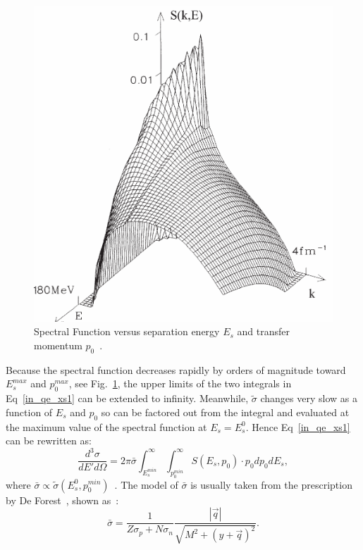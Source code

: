 \begin{figure}[!ht]
  \begin{center}
    \includegraphics[type=pdf,ext=.pdf,read=.pdf,width=0.60\linewidth]{./figures/physics/pkem}
    \caption[Spectral Function]{\footnotesize{Spectral Function versus separation energy $E_{s}$ and transfer momentum $p_{0}$~\cite{qe_donal}.}}
    \label{pkem}
  \end{center}
\end{figure}
Because the spectral function decreases rapidly by orders of magnitude toward $E_{s}^{max}$ and $p_{0}^{max}$, see Fig.~\ref{pkem}, the upper limits of the two integrals in Eq~\eqref{in_qe_xs1} can be extended to infinity. Meanwhile, $\tilde{\sigma}$ changes very slow as a function of $E_{s}$ and $p_{0}$ so can be factored out from the integral and evaluated at the maximum value of the spectral function at $E_{s}=E_{s}^{0}$. Hence Eq~\eqref{in_qe_xs1} can be rewritten as:
\begin{equation}
  \frac{d^{3}\sigma}{dE'd\Omega} = 2\pi \bar{\sigma}\int_{E_{s}^{min}}^{\infty} \int_{p_{0}^{min}}^{\infty}S(E_{s},p_{0})\cdot p_{0}dp_{0}dE_{s},
  \label{in_qe_xs2}
\end{equation}
where $\bar{\sigma} \propto \tilde{\sigma}(E_{s}^{0},p_{0}^{min})$~\cite{PhysRevB.36.1208}. The model of $\bar{\sigma}$ is usually taken from the prescription by De Forest~\cite{DeForest1983}, shown as~\cite{john_thesis}:
\begin{equation}
  \bar{\sigma} = \frac{1}{Z\sigma_{p}+N\sigma_{n}}\frac{|\vec{q}|}{\sqrt{M^{2}+(y+\vec{q})^{2}}}.
\end{equation}

